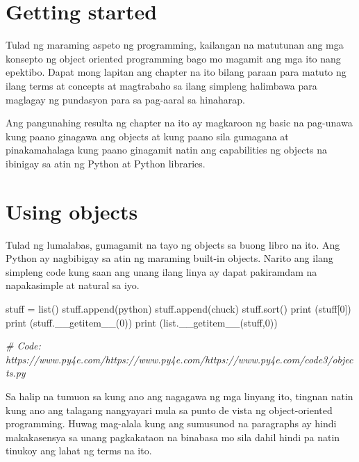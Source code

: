 \documentclass[10pt,]{book}
\newenvironment{Shaded}{}{}
\newcommand{\BuiltInTok}[1]{\textcolor[rgb]{0.00,0.50,0.00}{#1}}
\newcommand{\CommentTok}[1]{\textcolor[rgb]{0.38,0.63,0.69}{\textit{#1}}}
\newcommand{\DecValTok}[1]{\textcolor[rgb]{0.25,0.63,0.44}{#1}}
\newcommand{\FunctionTok}[1]{\textcolor[rgb]{0.02,0.16,0.49}{#1}}
\newcommand{\NormalTok}[1]{#1}
\newcommand{\OperatorTok}[1]{\textcolor[rgb]{0.40,0.40,0.40}{#1}}
\newcommand{\StringTok}[1]{\textcolor[rgb]{0.25,0.44,0.63}{#1}}
\begin{document}
\section{Getting started}\label{getting-started}

Tulad ng maraming aspeto ng programming, kailangan na matutunan ang mga
konsepto ng object oriented programming bago mo magamit ang mga ito nang
epektibo. Dapat mong lapitan ang chapter na ito bilang paraan para
matuto ng ilang terms at concepts at magtrabaho sa ilang simpleng
halimbawa para maglagay ng pundasyon para sa pag-aaral sa hinaharap.

Ang pangunahing resulta ng chapter na ito ay magkaroon ng basic na
pag-unawa kung paano ginagawa ang objects at kung paano sila gumagana at
pinakamahalaga kung paano ginagamit natin ang capabilities ng objects na
ibinigay sa atin ng Python at Python libraries.

\section{Using objects}\label{using-objects}

Tulad ng lumalabas, gumagamit na tayo ng objects sa buong libro na ito.
Ang Python ay nagbibigay sa atin ng maraming built-in objects. Narito
ang ilang simpleng code kung saan ang unang ilang linya ay dapat
pakiramdam na napakasimple at natural sa iyo.


\begin{Shaded}
\begin{Highlighting}[]
\NormalTok{stuff }\OperatorTok{=} \BuiltInTok{list}\NormalTok{()}
\NormalTok{stuff.append(}\StringTok{\textquotesingle{}python\textquotesingle{}}\NormalTok{)}
\NormalTok{stuff.append(}\StringTok{\textquotesingle{}chuck\textquotesingle{}}\NormalTok{)}
\NormalTok{stuff.sort()}
\BuiltInTok{print}\NormalTok{ (stuff[}\DecValTok{0}\NormalTok{])}
\BuiltInTok{print}\NormalTok{ (stuff.}\FunctionTok{\_\_getitem\_\_}\NormalTok{(}\DecValTok{0}\NormalTok{))}
\BuiltInTok{print}\NormalTok{ (}\BuiltInTok{list}\NormalTok{.}\FunctionTok{\_\_getitem\_\_}\NormalTok{(stuff,}\DecValTok{0}\NormalTok{))}

\CommentTok{\# Code: https://www.py4e.com/https://www.py4e.com/https://www.py4e.com/code3/objects.py}
\end{Highlighting}
\end{Shaded}

Sa halip na tumuon sa kung ano ang nagagawa ng mga linyang ito, tingnan
natin kung ano ang talagang nangyayari mula sa punto de vista ng
object-oriented programming. Huwag mag-alala kung ang sumusunod na
paragraphs ay hindi makakasensya sa unang pagkakataon na binabasa mo
sila dahil hindi pa natin tinukoy ang lahat ng terms na ito.
\end{document}
